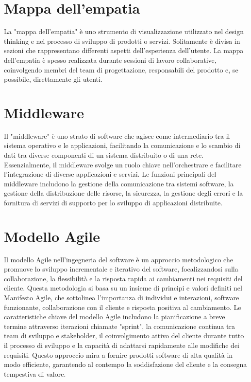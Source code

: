 \documentclass{article}
\begin{document}
\section {Mappa dell'empatia}
La "mappa dell'empatia" è uno strumento di visualizzazione utilizzato nel design thinking e nel processo di sviluppo di prodotti o servizi.
Solitamente è divisa in sezioni che rappresentano differenti aspetti dell'esperienza dell'utente.
La mappa dell'empatia è spesso realizzata durante sessioni di lavoro collaborative, coinvolgendo membri del team di progettazione, responsabili del prodotto e, se possibile, direttamente gli utenti.

\section{Middleware}
Il "middleware" è uno strato di software che agisce come intermediario tra il sistema operativo e le applicazioni, facilitando la comunicazione e lo scambio di dati tra diverse componenti di un sistema distribuito o di una rete. Essenzialmente, il middleware svolge un ruolo chiave nell'orchestrare e facilitare l'integrazione di diverse applicazioni e servizi. Le funzioni principali del middleware includono la gestione della comunicazione tra sistemi software, la gestione della distribuzione delle risorse, la sicurezza, la gestione degli errori e la fornitura di servizi di supporto per lo sviluppo di applicazioni distribuite.

\section{Modello Agile}
Il modello Agile nell'ingegneria del software è un approccio metodologico che promuove lo sviluppo incrementale e iterativo del software, focalizzandosi sulla collaborazione, la flessibilità e la risposta rapida ai cambiamenti nei requisiti del cliente. Questa metodologia si basa su un insieme di principi e valori definiti nel Manifesto Agile, che sottolinea l'importanza di individui e interazioni, software funzionante, collaborazione con il cliente e risposta positiva al cambiamento. Le caratteristiche chiave del modello Agile includono la pianificazione a breve termine attraverso iterazioni chiamate "sprint", la comunicazione continua tra team di sviluppo e stakeholder, il coinvolgimento attivo del cliente durante tutto il processo di sviluppo e la capacità di adattarsi rapidamente alle modifiche dei requisiti. Questo approccio mira a fornire prodotti software di alta qualità in modo efficiente, garantendo al contempo la soddisfazione del cliente e la consegna tempestiva di valore.
\end{document}

